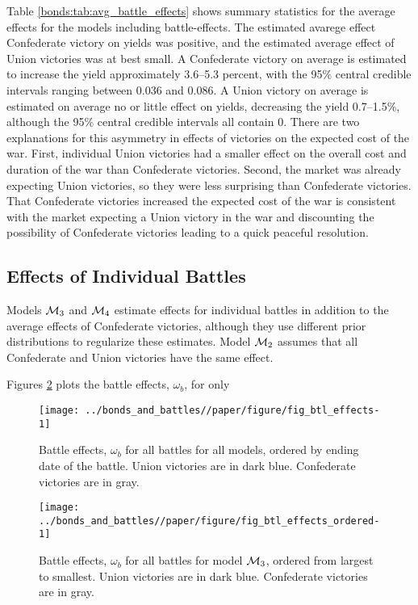 Table \ref{bonds:tab:avg_battle_effects} shows summary statistics for the average effects for the models including battle-effects.
The estimated avarege effect Confederate victory on yields was positive, and the estimated average effect of Union victories was at best small.
A Confederate victory on average is estimated to increase the yield approximately 3.6--5.3 percent, with the 95\% central credible intervals ranging between 0.036 and 0.086.
A Union victory on average is estimated on average no or little effect on yields, decreasing the yield 0.7--1.5\%, although the 95\% central credible intervals all contain 0.
There are two explanations for this asymmetry in effects of victories on the expected cost of the war.
First, individual Union victories had a smaller effect on the overall cost and duration of the war than Confederate victories.
Second, the market was already expecting Union victories, so they were less surprising than Confederate victories.
That Confederate victories increased the expected cost of the war is consistent with the market expecting a Union victory in the war and discounting the possibility of Confederate victories leading to a quick peaceful resolution.



\subsection{Effects of Individual Battles}
\label{sec:indiv-effects-battl}


Models $\Model{3}$ and $\mathcal{M}_{\text{4}}$ estimate effects for individual battles in addition to the average effects of Confederate victories, although they use different prior distributions to regularize these estimates.
Model $\mathcal{M}_{\text{2}}$ assumes that all Confederate and Union victories have the same effect.

Figures \ref{bonds:fig:btl_effects_ordered} plots the battle effects, $\omega_{b}$, for only

\begin{figure}[!htpb]
  \centering
  \texttt{[image: ../bonds\_and\_battles//paper/figure/fig\_btl\_effects-1]}
  \caption[Battle Effects on log-yields for all models]{Battle effects, $\omega_{b}$ for all battles for all models, ordered by ending date of the battle.
    Union victories are in dark blue. Confederate victories are in gray.
  }
  \label{bonds:fig:btl_effects}
\end{figure}


\begin{figure}[!htpb]
  \centering
  \texttt{[image: ../bonds\_and\_battles//paper/figure/fig\_btl\_effects\_ordered-1]}  
  \caption[Battle Effects on log-yields for model $\Model{3}$]{
    Battle effects, $\omega_{b}$ for all battles for model $\Model{3}$, ordered from largest to smallest.
    Union victories are in dark blue. Confederate victories are in gray.
  }
  \label{bonds:fig:btl_effects_ordered}
\end{figure}



